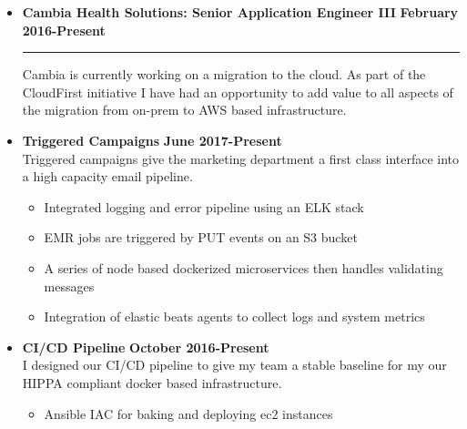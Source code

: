 \documentclass[overlapped]{res}
\begin{document}
\begin{resume}
\begin{itemize}[leftmargin=0in]
    \item[] 
        \textbf{Cambia Health Solutions: Senior Application Engineer III} \hfill \textbf{February 2016-Present} \\[-0.1in] \rule{\textwidth}{0.5pt}
        Cambia is currently working on a migration to the cloud. As part of the CloudFirst initiative I have had an opportunity to add value to all aspects of 
        the migration from on-prem to AWS based infrastructure.
        \vspace{0.125in}
        \item[] 
            \begin{samepage}
                \textbf{Triggered Campaigns} \hfill \textbf{June 2017-Present} \\
                Triggered campaigns give the marketing department a first class interface into a high capacity email pipeline.
                \begin{itemize}
                    \item[\textbullet] Integrated logging and error pipeline using an ELK stack
                    \item[\textbullet] EMR jobs are triggered by PUT events on an S3 bucket
                    \item[\textbullet] A series of node based dockerized microservices then handles validating messages
                    \item[\textbullet] Integration of elastic beats agents to collect logs and system metrics
                \end{itemize}
            \end{samepage}
            \vspace{0.125in}
        \item[] 
            \begin{samepage}
                \textbf{CI/CD Pipeline} \hfill \textbf{October 2016-Present} \\
                I designed our CI/CD pipeline to give my team a stable baseline for my our HIPPA compliant docker based infrastructure.
                \begin{itemize}
                    \item[\textbullet] Ansible IAC for baking and deploying ec2 instances

\end{itemize}
\end{samepage}
\end{itemize}
\end{resume}
\end{document}
